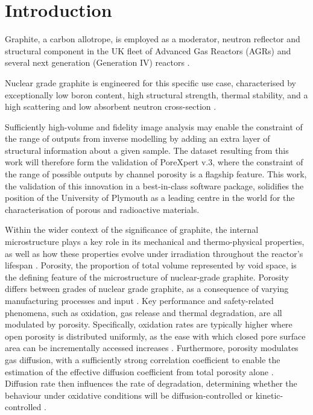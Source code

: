 \documentclass[12pt,a4paper]{report}
\begin{document}
	
\chapter{Introduction}

Graphite, a carbon allotrope, is employed as a moderator, neutron reflector and structural component in the UK fleet of Advanced Gas Reactors (AGRs) and several next generation (Generation IV) reactors \citep{MARSDENgeniv}.

Nuclear grade graphite is engineered for this specific use case, characterised by exceptionally low boron content, high structural strength, thermal stability, and a high scattering and low absorbent neutron cross-section \citep{Marsden2016}.

Sufficiently high-volume and fidelity image analysis may enable the constraint of the range of outputs from inverse modelling by adding an extra layer of structural information about a given sample. The dataset resulting from this work will therefore form the validation of PoreXpert\texttrademark{} v.3, where the constraint of the range of possible outputs by channel porosity is a flagship feature.  This work,  the validation of this innovation in a best-in-class software package, solidifies the position of the University of Plymouth as a leading centre in the world for the characterisation of porous and radioactive materials.

Within the wider context of the significance of graphite, the internal microstructure plays a key role in its mechanical and thermo-physical properties, as well as how these properties evolve under irradiation throughout the reactor's lifespan \citep{MARSDENgeniv}. Porosity, the proportion of total volume represented by void space,  is the defining feature of the microstructure of nuclear-grade graphite.  Porosity differs between grades of nuclear grade graphite, as a consequence of varying manufacturing processes and input \citep{ARREGUIMENA2022112047}. Key performance and safety-related phenomena, such as oxidation, gas release and thermal degradation, are all modulated by porosity. Specifically, oxidation rates are typically higher where open porosity is distributed uniformly, as the ease with which closed pore surface area can be incrementally accessed increases \citep{PAUL2022132}. Furthermore, porosity modulates gas diffusion, with a sufficiently strong correlation coefficient to enable the estimation of the effective diffusion coefficient from total porosity alone \citep{KANE2018369}. Diffusion rate then influences the rate of degradation, determining whether the behaviour under oxidative conditions will be diffusion-controlled or kinetic-controlled \citep{MATTHEWS2021111245}. 
\end{document}
